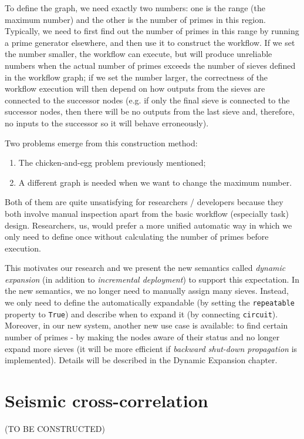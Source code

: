 To define the graph, we need exactly two numbers: one is the range (\ie the maximum number) and the other is the number of primes in this region. Typically, we need to first find out the number of primes in this range by running a prime generator elsewhere, and then use it to construct the workflow. If we set the number smaller, the workflow can execute, but will produce unreliable numbers when the actual number of primes exceeds the number of sieves defined in the workflow graph; if we set the number larger, the correctness of the workflow execution will then depend on how outputs from the sieves are connected to the successor nodes (e.g. if only the final sieve is connected to the successor nodes, then there will be no outputs from the last sieve and, therefore, no inputs to the successor so it will behave erroneously).

Two problems emerge from this construction method:
\begin{enumerate}
	\item The chicken-and-egg problem previously mentioned;
	\item A different graph is needed when we want to change the maximum number.
\end{enumerate}

Both of them are quite unsatisfying for researchers / developers because they both involve manual inspection apart from the basic workflow (especially task) design. Researchers, \eg us, would prefer a more unified automatic way in which we only need to define once without calculating the number of primes before execution.

This motivates our research and we present the new semantics called \emph{dynamic expansion} (in addition to \emph{incremental deployment}) to support this expectation. In the new semantics, we no longer need to manually assign many sieves. Instead, we only need to define the \cdSieve automatically expandable (by setting the \lstinline|repeatable| property to \lstinline|True|) and describe when to expand it (by connecting \lstinline|circuit|). Moreover, in our new system, another new use case is available: to find certain number of primes - by making the \cdSieve nodes aware of their status and no longer expand more sieves (it will be more efficient if \emph{backward shut-down propagation} is implemented). Details will be described in the Dynamic Expansion chapter.

\section{Seismic cross-correlation}
(TO BE CONSTRUCTED)
